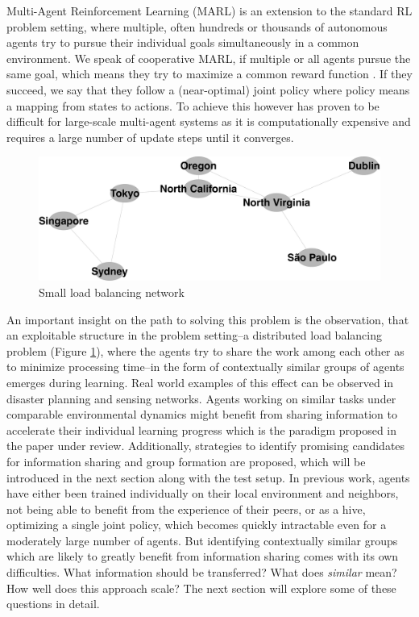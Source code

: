 \documentclass[letterpaper]{article}
\begin{document}
Multi-Agent Reinforcement Learning (MARL) is an extension to the standard RL problem setting, where multiple, often hundreds or thousands of autonomous agents try to pursue their individual goals simultaneously in a common environment. We speak of cooperative MARL, if multiple or all agents pursue the same goal, which means they try to maximize a common reward function \citep{tuyls2005evolutionary}. If they succeed, we say that they follow a (near-optimal) joint policy where policy means a mapping from states to actions. To achieve this however has proven to be difficult for large-scale multi-agent systems as it is computationally expensive and requires a large number of update steps until it converges.
\begin{figure}[H]
 \begin{center}
  \includegraphics[width=.6\linewidth]{figures/loadbalancing}
  \caption{Small load balancing network \citep{garant2015accelerating}}
  \label{fig:loadbalancing}
 \end{center}
\end{figure}
\vspace{-5mm}
An important insight on the path to solving this problem is the observation, that an exploitable structure in the problem setting--a distributed load balancing problem (Figure \ref{fig:loadbalancing}), where the agents try to share the work among each other as to minimize processing time--in the form of contextually similar groups of agents emerges during learning. Real world examples of this effect can be observed in disaster planning and sensing networks. Agents working on similar tasks under comparable environmental dynamics might benefit from sharing information to accelerate their individual learning progress which is the paradigm proposed in the paper under review. Additionally, strategies to identify promising candidates for information sharing and group formation are proposed, which will be introduced in the next section along with the test setup. In previous work, agents have either been trained individually on their local environment and neighbors, not being able to benefit from the experience of their peers, or as a hive, optimizing a single joint policy, which becomes quickly intractable even for a moderately large number of agents. But identifying contextually similar groups which are likely to greatly benefit from information sharing comes with its own difficulties. What information should be transferred? What does \textit{similar} mean? How well does this approach scale? The next section will explore some of these questions in detail.
\end{document}
